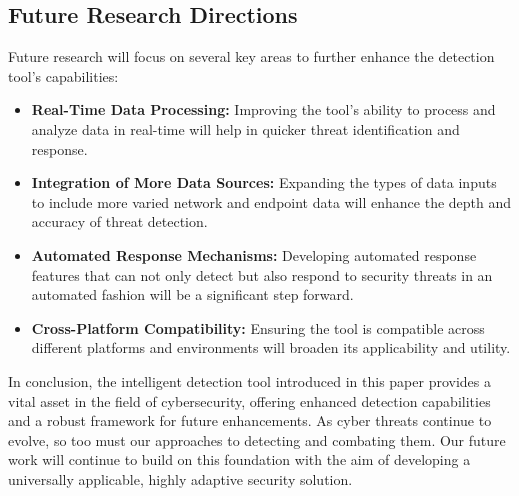 \subsection{Future Research Directions}\label{sec:future-research}
Future research will focus on several key areas to further enhance the detection tool's capabilities:
\begin{itemize}
    \item \textbf{Real-Time Data Processing:} Improving the tool's ability to process and analyze data in real-time will help in quicker threat identification and response.
    \item \textbf{Integration of More Data Sources:} Expanding the types of data inputs to include more varied network and endpoint data will enhance the depth and accuracy of threat detection.
    \item \textbf{Automated Response Mechanisms:} Developing automated response features that can not only detect but also respond to security threats in an automated fashion will be a significant step forward.
    \item \textbf{Cross-Platform Compatibility:} Ensuring the tool is compatible across different platforms and environments will broaden its applicability and utility.
\end{itemize}

In conclusion, the intelligent detection tool introduced in this paper provides a vital asset in the field of cybersecurity, offering enhanced detection capabilities and a robust framework for future enhancements. As cyber threats continue to evolve, so too must our approaches to detecting and combating them. Our future work will continue to build on this foundation with the aim of developing a universally applicable, highly adaptive security solution.
